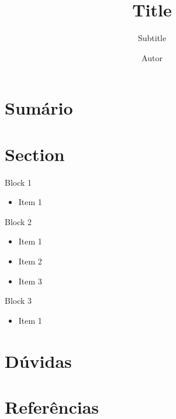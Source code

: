 \documentclass{custom-beamer}
\title{Title}
\subtitle{Subtitle}
\author{Autor}
\institute{Institute}
\date{\the\year}
\begin{document}
\begin{frame}[fragile]
\titlepage
\end{frame}

\section{Sumário}

\begin{frame}[fragile]
\tableofcontents
\end{frame}

\section{Section}

\begin{frame}[fragile]
\begin{block}{Block 1}
\begin{itemize}
	\item Item 1 \cite{vapnik2000nature}
\end{itemize}
\end{block}
\begin{block}{Block 2}
\begin{itemize}
	\item Item 1
	\item Item 2
	\item Item 3
\end{itemize}
\end{block}
\begin{block}{Block 3}
\begin{itemize}
	\item Item 1
\end{itemize}
\end{block}
\end{frame}

\section{Dúvidas}

\begin{frame}[fragile]
\questionspage
\end{frame}

\section{Referências}

\begin{frame}[fragile]

\end{frame}
\end{document}
